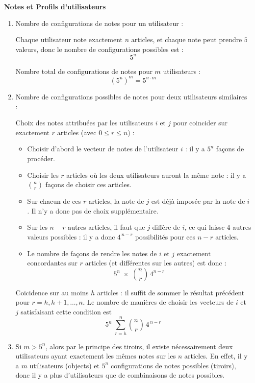\documentclass[10pt,a4paper]{article}
\begin{document}
\q \textbf{Notes et Profils d'utilisateurs}
    \begin{enumerate}

        \item Nombre de configurations de notes pour un utilisateur :

        Chaque utilisateur note exactement \( n \) articles, et chaque note peut prendre \( 5 \)
        valeurs, donc le nombre de configurations possibles est :
        $$ 5^n $$

        Nombre total de configurations de notes pour \( m \) utilisateurs :
        $$ (5^n)^m = 5^{n \cdot m} $$

        \item Nombre de configurations possibles de notes pour deux utilisateurs similaires :

        Choix des notes attribuées par les utilisateurs \(i\) et \(j\) pour coincider sur exactement
        \(r\) articles (avec \(0 \le r \le n\)) :

        \begin{itemize}
            \item Choisir d'abord le vecteur de notes de l'utilisateur \(i\) : il y a \(5^n\) façons
            de procéder.
            \item Choisir les \(r\) articles où les deux utilisateurs auront la même note : il y a
            \(\displaystyle \binom{n}{r}\) façons de choisir ces articles.
            \item Sur chacun de ces \(r\) articles, la note de \(j\) est déjà imposée par la note de
            \(i\). Il n'y a donc pas de choix supplémentaire.
            \item Sur les \(n - r\) autres articles, il faut que \(j\) diffère de \(i\), ce qui
            laisse 4 autres valeurs possibles : il y a donc \(4^{\,n-r}\) possibilités pour ces
            \(n-r\) articles.
            \item Le nombre de façons de rendre les notes de \(i\) et \(j\) exactement concordantes
            sur \(r\) articles (et différentes sur les autres) est donc :
            \[
            5^n \;\times\; \binom{n}{r}\,4^{n-r}
            \]
        \end{itemize}

        Coicidence sur au moins \(h\) articles : il suffit de sommer le résultat précédent pour \(r
        = h, h+1, \ldots, n\). Le nombre de manières de choisir les vecteurs de \(i\) et \(j\)
        satisfaisant cette condition est
        \[
        5^n \;\sum_{r=h}^{n} \binom{n}{r}\,4^{\,n-r}
        \]

        \item Si $m > 5^n$, alors par le principe des tiroirs, il existe nécessairement deux
        utilisateurs ayant exactement les mêmes notes sur les $n$ articles. En effet, il y a $m$
        utilisateurs (objects) et $5^n$ configurations de notes possibles (tiroirs), donc il y a
        plus d'utilisateurs que de combinaisons de notes possibles.
        \end{enumerate}
\end{document}
